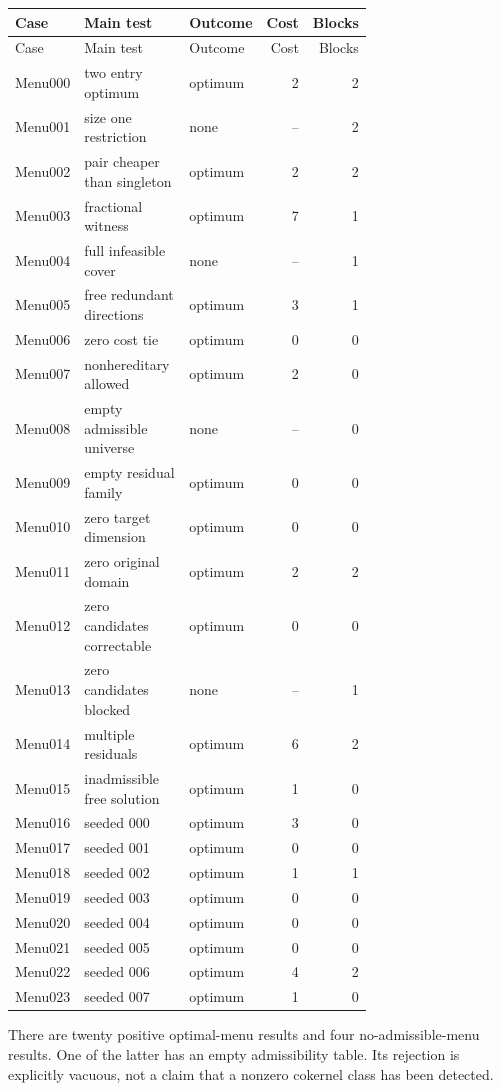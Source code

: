 \documentclass[11pt,letterpaper,oneside,openany]{book}
\theoremstyle{quiet}
\begin{document}
\begin{longtable}{@{}p{0.12\linewidth}p{0.44\linewidth}p{0.15\linewidth}rr@{}}
\toprule Case & Main test & Outcome & Cost & Blocks\\\midrule
\endfirsthead
\toprule Case & Main test & Outcome & Cost & Blocks\\\midrule
\endhead
Menu000 & two entry optimum & optimum & 2 & 2\\
Menu001 & size one restriction & none & -- & 2\\
Menu002 & pair cheaper than singleton & optimum & 2 & 2\\
Menu003 & fractional witness & optimum & 7 & 1\\
Menu004 & full infeasible cover & none & -- & 1\\
Menu005 & free redundant directions & optimum & 3 & 1\\
Menu006 & zero cost tie & optimum & 0 & 0\\
Menu007 & nonhereditary allowed & optimum & 2 & 0\\
Menu008 & empty admissible universe & none & -- & 0\\
Menu009 & empty residual family & optimum & 0 & 0\\
Menu010 & zero target dimension & optimum & 0 & 0\\
Menu011 & zero original domain & optimum & 2 & 2\\
Menu012 & zero candidates correctable & optimum & 0 & 0\\
Menu013 & zero candidates blocked & none & -- & 1\\
Menu014 & multiple residuals & optimum & 6 & 2\\
Menu015 & inadmissible free solution & optimum & 1 & 0\\
Menu016 & seeded 000 & optimum & 3 & 0\\
Menu017 & seeded 001 & optimum & 0 & 0\\
Menu018 & seeded 002 & optimum & 1 & 1\\
Menu019 & seeded 003 & optimum & 0 & 0\\
Menu020 & seeded 004 & optimum & 0 & 0\\
Menu021 & seeded 005 & optimum & 0 & 0\\
Menu022 & seeded 006 & optimum & 4 & 2\\
Menu023 & seeded 007 & optimum & 1 & 0\\
\bottomrule\end{longtable}

There are twenty positive optimal-menu results and four no-admissible-menu results. One of the latter has an empty admissibility table. Its rejection is explicitly vacuous, not a claim that a nonzero cokernel class has been detected.
\end{document}
